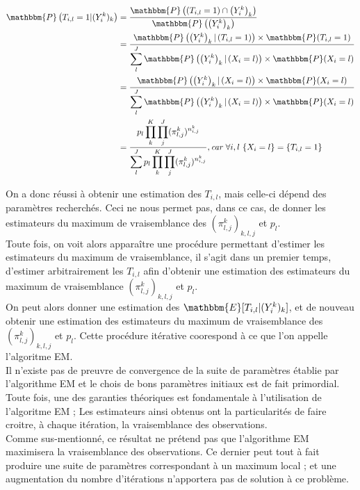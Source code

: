 \documentclass[frenchb]{report}
\newcommand{\1}{\mathbbm{1}}
\newcommand{\E}{\mathbbm{E}}
\newcommand{\prob}{\mathbbm{P}}
\theoremstyle{definition}\newtheorem{defn}{Définition}
\theoremstyle{definition}\newtheorem{exm}{Exemple}
\theoremstyle{definition}\newtheorem{nota}{Notation}
\theoremstyle{definition}\newtheorem{rem}{Remarque}
\begin{document}
\begin{center}
	\begin{align*}
		\prob\left( T_{i,l} = 1 |(Y^k_i)_k \right) &= \displaystyle \frac{\prob \left( \left( T_{i,l} = 1 \right) \cap \left(Y^k_i\right)_k\right)}{\prob \left( \left( Y^k_i \right)_k \right)}\\
		&= \displaystyle \frac{\prob \left( \left(Y^k_i \right)_k | \left( T_{i,l} =1 \right) \right) \times \prob (T_{i,l} = 1)}{\displaystyle \sum_l^J \prob \left( \left(Y^k_i \right)_k | \left( X_i = l \right) \right) \times \prob (X_i = l)}\\
		&= \displaystyle \frac{\prob \left( \left(Y^k_i \right)_k | \left( X_i = l \right) \right) \times \prob (X_i = l)}{\displaystyle \sum_l^J \prob \left( \left(Y^k_i \right)_k | \left( X_i = l \right) \right) \times \prob (X_i = l)}\\
		&= \displaystyle \frac{p_l \displaystyle \prod_k^K \displaystyle \prod_j^J (\pi^k_{l,j})^{n^k_{i,j}}}{\displaystyle \sum_l^J p_l \displaystyle \prod_k^K \displaystyle \prod_j^J (\pi^k_{l,j})^{n^k_{i,j}}}, \textit{car } \forall i,l ~\{X_i = l\} = \{T_{i,l} = 1\}\\
	\end{align*}
\end{center}

On a donc réussi à obtenir une estimation des $T_{i,l}$, mais celle-ci dépend des paramètres recherchés. Ceci ne nous permet pas, dans ce cas, de donner les estimateurs du maximum de vraisemblance des $(\pi^k_{l,j})_{k,l,j}$ et $p_l$. \\
Toute fois, on voit alors apparaître une procédure permettant d'estimer les estimateurs du maximum de vraisemblance, il s'agit dans un premier temps, d'estimer arbitrairement les $T_{i,l}$ afin d'obtenir une estimation des estimateurs du maximum de vraisemblance $(\pi^k_{l,j})_{k,l,j}$ et $p_l$.\\
On peut alors donner une estimation des $\E[T_{i,l}|(Y^k_i)_k]$, et de nouveau obtenir une estimation des estimateurs du maximum de vraisemblance des $(\pi^k_{l,j})_{k,l,j}$ et $p_l$. Cette procédure itérative coorespond à ce que l'on appelle l'algoritme EM.\\

Il n'existe pas de preuvre de convergence de la suite de paramètres établie par l'algorithme EM et le chois de bons paramètres initiaux est de fait primordial.\\
Toute fois, une des garanties théoriques est fondamentale à l'utilisation de l'algoritme EM ; Les estimateurs ainsi obtenus ont la particularités de faire croitre, à chaque itération, la vraisemblance des observations. \\
Comme sus-mentionné, ce résultat ne prétend pas que l'algorithme EM maximisera la vraisemblance des observations. Ce dernier peut tout à fait produire une suite de paramètres correspondant à un maximum local ; et une augmentation du nombre d'itérations n'apportera pas de solution à ce problème.
\end{document}
